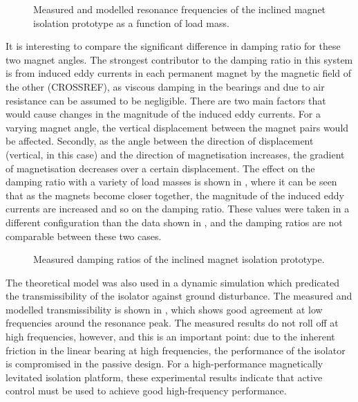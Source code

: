 \documentclass[11pt,a4paper]{memoir}
\begin{document}
\begin{figure}
\centering
{}
\caption{Measured and modelled resonance frequencies of the inclined magnet isolation prototype as a function of load mass.}
\end{figure}

It is interesting to compare the significant difference in damping ratio for these two magnet angles.
The strongest contributor to the damping ratio in this system is from induced eddy currents in each permanent magnet by the magnetic field of the other (CROSSREF), as viscous damping in the bearings and due to air resistance can be assumed to be negligible.
There are two main factors that would cause changes in the magnitude of the induced eddy currents.
For a varying magnet angle, the vertical displacement between the magnet pairs would be affected.
Secondly, as the angle between the direction of displacement (vertical, in this case) and the direction of magnetisation increases, the gradient of magnetisation decreases over a certain displacement.
The effect on the damping ratio with a variety of load masses is shown in , where it can be seen that as the magnets become closer together, the magnitude of the induced eddy currents are increased and so on the damping ratio.
These values were taken in a different configuration than the data shown in , and the damping ratios are not comparable between these two cases.

\begin{figure}
\centering
{}
\caption{Measured damping ratios of the inclined magnet isolation prototype.}
\end{figure}

The theoretical model was also used in a dynamic simulation which predicated the transmissibility of the isolator against ground disturbance.
The measured and modelled transmissibility is shown in , which shows good agreement at low frequencies around the resonance peak.
The measured results do not roll off at high frequencies, however, and this is an important point: due to the inherent friction in the linear bearing at high frequencies, the performance of the isolator is compromised in the passive design.
For a high-performance magnetically levitated isolation platform, these experimental results indicate that active control must be used to achieve good high-frequency performance.
\end{document}
